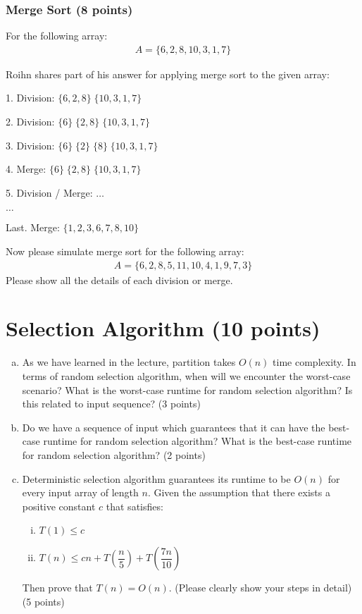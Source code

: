 \documentclass[11pt]{exam}
\begin{document}
\subsubsection{Merge Sort (8 points)}
For the following array:
\begin{align*}
A = \{6, 2, 8, 10, 3, 1, 7\}
\end{align*}

Roihn shares part of his answer for applying merge sort to the given array: 
\begin{solution}

1. Division: $\{6,2,8\}\;\{10,3,1,7\}$

2. Division: $\{6\}\;\{2,8\}\;\{10,3,1,7\}$

3. Division: $\{6\}\;\{2\}\;\{8\}\;\{10,3,1,7\}$

4. Merge: $\{6\}\;\{2,8\}\;\{10,3,1,7\}$

5. Division / Merge: $\dots$

$\dots$

Last. Merge: $\{1,2,3,6,7,8,10\}$
\end{solution}

Now please simulate merge sort for the following array:
\begin{align*}
A = \{6, 2, 8, 5, 11, 10, 4, 1, 9, 7, 3\}
\end{align*}
Please show all the details of each division or merge. 
\begin{solution}
\end{solution}
\newpage
\section{Selection Algorithm (10 points)}

\begin{enumerate}[(a)]
\item As we have learned in the lecture, partition takes $O(n)$ time complexity. In terms of random selection algorithm, when will we encounter the worst-case scenario? What is the worst-case runtime for random selection algorithm? Is this related to input sequence? (3 points)

\item Do we have a sequence of input which guarantees that it can have the best-case runtime for random selection algorithm? What is the best-case runtime for random selection algorithm? (2 points)

\item Deterministic selection algorithm guarantees its runtime to be $O(n)$ for every input array of length $n$. Given the assumption that there exists a positive constant $c$ that satisfies:
\begin{enumerate}[i)]
\item $T(1)\leq c$
\item $T(n) \leq cn + T\left(\dfrac{n}{5}\right) +  T\left(\dfrac{7n}{10}\right)$
\end{enumerate}

Then prove that $T(n) = O(n)$. (Please clearly show your steps in detail) (5 points)
\end{enumerate}

\begin{solution}
\end{solution}
\end{document}
